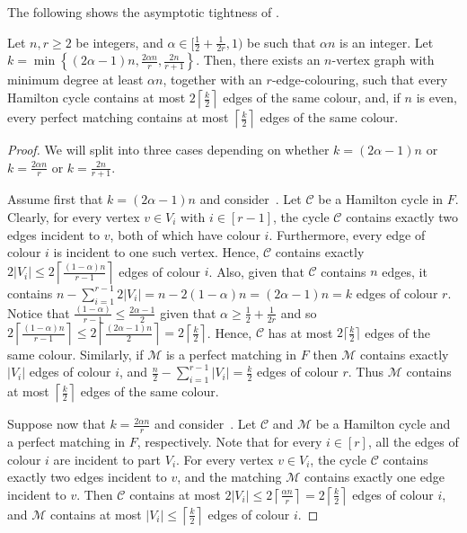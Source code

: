 \documentclass[10pt,a4paper,reqno]{amsart}
\begin{document}
The following shows the asymptotic tightness of .
\begin{proposition}
\label{prop:construction_deterministic_tight}
  Let $n,r \geq 2$ be integers, and $\alpha \in [\frac{1}{2} + \frac{1}{2r}, 1)$ be such that $\alpha n$ is an integer. Let $k = \min\left\{(2\alpha - 1)n, \frac{2\alpha n}{r}, \frac{2n}{r + 1}\right\}$. Then, there
  exists an $n$-vertex graph with minimum degree at least $\alpha n$, together with an $r$-edge-colouring, such that every Hamilton cycle contains at most $2\left\lceil \frac{k}{2} \right\rceil$ edges of the same colour, and, if $n$ is even, every perfect matching contains at most $\left\lceil \frac{k}{2} \right\rceil$ edges of the
  same colour.
\end{proposition}
\begin{proof}
We will split into three cases depending on whether $k = (2\alpha - 1)n$ or $k = \frac{2\alpha n}{r}$ or $k = \frac{2 n}{r+1}$.

\medskip
Assume first that $k = (2\alpha - 1)n$ and consider~. Let $\mathcal{C}$ be a Hamilton cycle in $F$. Clearly, for every vertex $v \in V_{i}$ with $i \in [r - 1]$, the cycle $\mathcal{C}$ contains exactly two edges incident to $v$, both of which have colour $i$. Furthermore, every edge of colour $i$ is incident to one such vertex. Hence, $\mathcal{C}$ contains exactly $2|V_i| \le 2\left\lceil\frac{(1 - \alpha)n}{r - 1}\right\rceil$ edges of colour $i$. Also, given that $\mathcal{C}$ contains $n$ edges, it contains $n - \sum_{i=1}^{r-1}2|V_i| = n - 2(1 - \alpha)n = (2\alpha - 1)n = k$ edges of colour $r$. Notice that $\frac{(1 - \alpha)}{r - 1} \le \frac{2\alpha - 1}{2}$ given that $\alpha \geq \frac{1}{2} + \frac{1}{2r}$ and so $2\left\lceil\frac{(1 - \alpha)n}{r - 1}\right\rceil \le 2\left\lceil\frac{(2\alpha - 1)n}{2}\right\rceil = 2\left\lceil \frac{k}{2} \right\rceil$. Hence, $\mathcal{C}$ has at most $2\lceil \frac{k}{2} \rceil$ edges of the same colour.  Similarly, if $\mathcal{M}$ is a perfect matching in $F$ then $\mathcal{M}$ contains exactly $|V_i|$ edges of colour $i$, and $\frac{n}{2} - \sum_{i=1}^{r-1}|V_i| = \frac{k}{2}$ edges of colour $r$. Thus $\mathcal{M}$ contains at most $\left\lceil \frac{k}{2} \right\rceil$ edges of the same colour.


\medskip
Suppose now that $k = \frac{2\alpha n}{r}$ and consider~. Let $\mathcal{C}$ and $\mathcal{M}$ be a Hamilton cycle and a perfect matching in $F$, respectively. Note that for every $i \in [r]$, all the edges of colour $i$ are incident to part $V_i$. For every vertex $v \in V_i$, the cycle $\mathcal{C}$ contains exactly two edges incident to $v$, and the matching $\mathcal{M}$ contains exactly one edge incident to $v$. Then $\mathcal{C}$ contains at most $2|V_i| \le 2\left\lceil\frac{\alpha n}{r}\right\rceil = 2\left\lceil \frac{k}{2}\right\rceil$ edges of colour $i$, and $\mathcal{M}$ contains at most $|V_i| \le \left\lceil \frac{k}{2}\right\rceil$ edges of colour $i$.



\end{proof}
\end{document}
